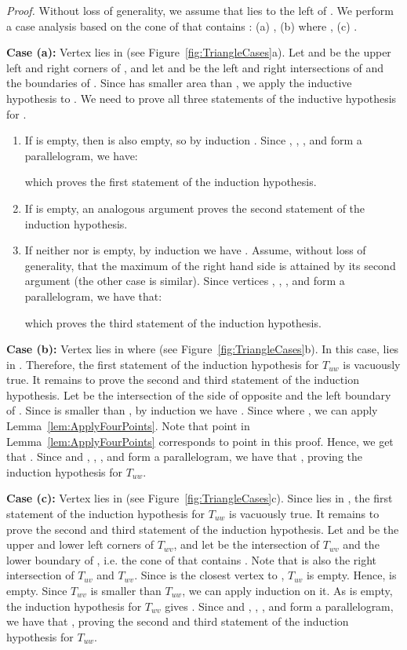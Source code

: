 \documentclass[12pt]{article}
\newenvironment{proof}{\emph{Proof.}}{\hfill \\}
\newcommand{\canon}[2]{\ensuremath{T_{#1 #2}}}
\begin{document}
\begin{proof}
  Without loss of generality, we assume that  lies to the left of . We perform a case analysis based on the cone of  that contains : (a) , (b)  where , (c) . 

  \textbf{Case (a):} Vertex  lies in  (see Figure~\ref{fig:TriangleCases}a). Let  and  be the upper left and right corners of , and let  and  be the left and right intersections of  and the boundaries of . Since  has smaller area than , we apply the inductive hypothesis to . We need to prove all three statements of the inductive hypothesis for .

  \begin{enumerate}
  \item If  is empty, then  is also empty, so by induction . Since , , , and  form a parallelogram, we have:
  
  which proves the first statement of the induction hypothesis.

  \item If  is empty, an analogous argument proves the second statement of the induction hypothesis.

  \item If neither  nor  is empty, by induction we have . Assume, without loss of generality, that the maximum of the right hand side is attained by its second argument  (the other case is similar). Since vertices , , , and  form a parallelogram, we have that:
  
  which proves the third statement of the induction hypothesis. 
  \end{enumerate}

  \textbf{Case (b):} Vertex  lies in  where  (see Figure~\ref{fig:TriangleCases}b). In this case,  lies in . Therefore, the first statement of the induction hypothesis for \canon{u}{w} is vacuously true. It remains to prove the second and third statement of the induction hypothesis. Let  be the intersection of the side of  opposite  and the left boundary of . Since  is smaller than , by induction we have . Since  where , we can apply Lemma~\ref{lem:ApplyFourPoints}. Note that point  in Lemma~\ref{lem:ApplyFourPoints} corresponds to point  in this proof. Hence, we get that . Since  and , , , and  form a parallelogram, we have that , proving the induction hypothesis for \canon{u}{w}.

  \textbf{Case (c):} Vertex  lies in  (see Figure~\ref{fig:TriangleCases}c). Since  lies in , the first statement of the induction hypothesis for \canon{u}{w} is vacuously true. It remains to prove the second and third statement of the induction hypothesis. Let  and  be the upper and lower left corners of \canon{w}{v}, and let  be the intersection of \canon{w}{v} and the lower boundary of , i.e. the cone of  that contains . Note that  is also the right intersection of \canon{u}{v} and \canon{w}{v}. Since  is the closest vertex to , \canon{u}{v} is empty. Hence,  is empty. Since \canon{w}{v} is smaller than \canon{u}{w}, we can apply induction on it. As  is empty, the induction hypothesis for \canon{w}{v} gives . Since  and , , , and  form a parallelogram, we have that , proving the second and third statement of the induction hypothesis for \canon{u}{w}. 
\end{proof}
\end{document}
